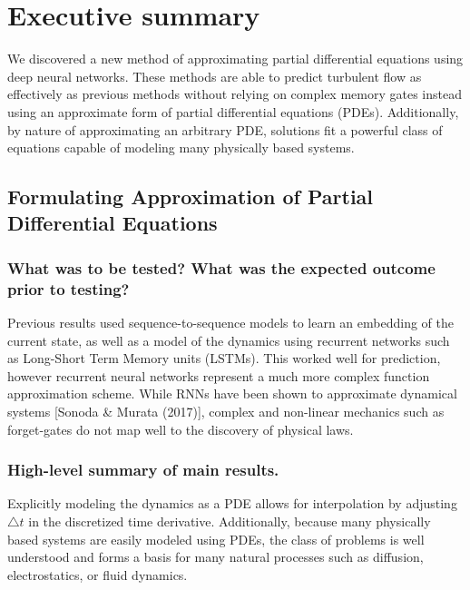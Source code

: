 \documentclass[12pt]{article}
\theoremstyle{plain}
\theoremstyle{remark}
\theoremstyle{definition}
\begin{document}


\section{Executive summary}

We discovered a new method of approximating partial differential equations using deep neural networks. These methods are able to predict turbulent flow as effectively as previous methods without relying on complex memory gates instead using an approximate form of partial differential equations (PDEs). Additionally, by nature of approximating an arbitrary PDE, solutions fit a powerful class of equations capable of modeling many physically based systems.

\subsection{Formulating Approximation of Partial Differential Equations}

\subsubsection{What was to be tested? What was the expected outcome prior to testing?}
Previous results used sequence-to-sequence models to learn an embedding of the current state, as well as a model of the dynamics using recurrent networks such as Long-Short Term Memory units (LSTMs). This worked well for prediction, however recurrent neural networks represent a much more complex function approximation scheme. While RNNs have been shown to approximate dynamical systems [Sonoda \& Murata (2017)], complex and non-linear mechanics such as forget-gates do not map well to the discovery of physical laws.

\subsubsection{High-level summary of main results.}
Explicitly modeling the dynamics as a PDE allows for interpolation by adjusting $\bigtriangleup t$ in the discretized time derivative. Additionally, because many physically based systems are easily modeled using PDEs, the class of problems is well understood and forms a basis for many natural processes such as diffusion, electrostatics, or fluid dynamics.
\end{document}
